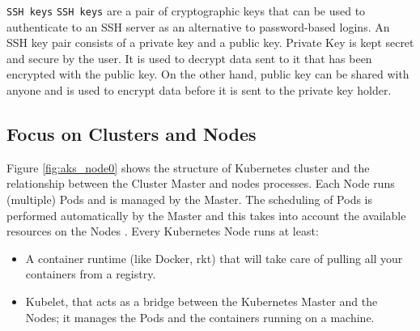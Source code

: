 \documentclass{article}
\begin{document}
\begin{description}
\item{\texttt{SSH keys}} \texttt{SSH keys} are a pair of cryptographic keys that can be used to authenticate to an SSH server as an alternative to password-based logins. An SSH key pair consists of a private key and a public key. Private Key  is kept secret and secure by the user. It is used to decrypt data sent to it that has been encrypted with the public key. On the other hand, public key can be shared with anyone and is used to encrypt data before it is sent to the private key holder. 
\end{description}

\subsection*{Focus on Clusters and Nodes}  
Figure \ref{fig:aks_node0} shows the structure of Kubernetes cluster and the relationship between the Cluster Master and nodes processes. Each Node runs (multiple) Pods and is managed by the Master. The scheduling of Pods is performed automatically by the Master and this takes into account the available resources on the Nodes \cite{kubmaster} \cite{kubboot}. Every Kubernetes Node runs at least:

\begin{itemize}
\item A container runtime (like Docker, rkt) that will take care of pulling all your containers from a registry.
\item  Kubelet, that acts as a bridge between the Kubernetes Master and the Nodes; it manages the Pods and the containers running on a machine.
\end{itemize}
\end{document}
